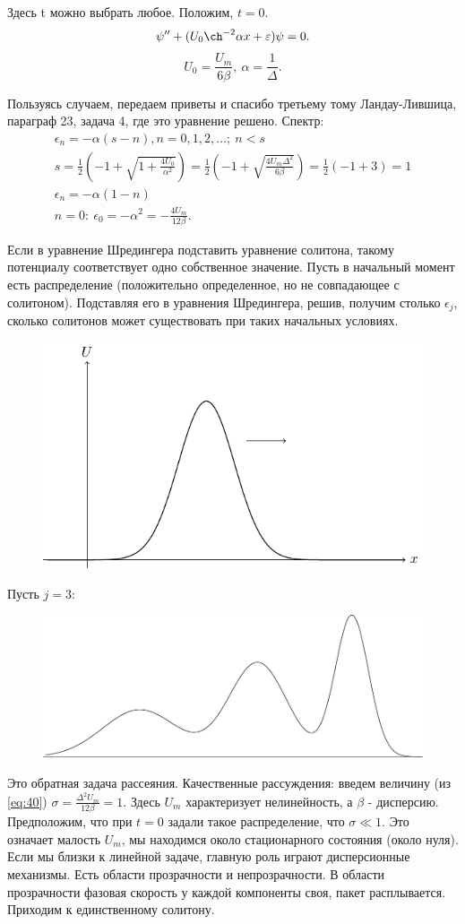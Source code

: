 Здесь t можно выбрать любое. Положим, $t=0$.
\begin{equation}
	\psi''+(U_0 \ch^{-2}\alpha x+\epsilon)\psi=0.
	\label{eq:44}
\end{equation}
\begin{equation*}
	U_0=\frac{U_m}{6\beta},~\alpha=\frac1{\Delta}.
\end{equation*}

Пользуясь случаем, передаем приветы и спасибо третьему тому Ландау-Лившица, параграф 23, задача 4, где это уравнение решено. Спектр:
\begin{gather*}
	\epsilon_n=-\alpha(s-n), n=0,1,2,\dots;~n<s \\ s=\frac12(-1+\sqrt{1+\frac{4U_0}{\alpha^2}})=\frac12(-1+\sqrt{\frac{4U_m\Delta^2}{6\beta}})=\frac12(-1+3)=1 \\ \epsilon_n=-\alpha(1-n) \\ n=0:~ \epsilon_0=-\alpha^2=-\frac{4U_m}{12\beta}.
\end{gather*}

Если в уравнение Шредингера подставить уравнение солитона, такому потенциалу соответствует одно собственное значение. Пусть в начальный момент есть распределение (положительно определенное, но не совпадающее с солитоном). Подставляя его в уравнения Шредингера, решив, получим столько $\epsilon_j$, сколько солитонов может существовать при таких начальных условиях.
\begin{figure}[H]
	\centering
	\includegraphics[width=0.4\linewidth]{fig/fig25.pdf}   
\end{figure}

Пусть $j=3$:
\begin{figure}[H]
	\centering
	\includegraphics[width=0.4\linewidth]{fig/fig26.pdf}   
\end{figure}

Это обратная задача рассеяния. Качественные рассуждения: введем величину (из \eqref{eq:40}) $\sigma=\frac{\Delta^2 U_m}{12 \beta}=1$. Здесь $U_m$ характеризует нелинейность, а $\beta$ - дисперсию. Предположим, что при $t=0$ задали такое распределение, что $\sigma \ll 1$. Это означает малость $U_m$, мы находимся около стационарного состояния (около нуля). Если мы близки к линейной задаче, главную роль играют дисперсионные механизмы. Есть области прозрачности и непрозрачности. В области прозрачности фазовая скорость у каждой компоненты своя, пакет расплывается.  Приходим к единственному солитону.

